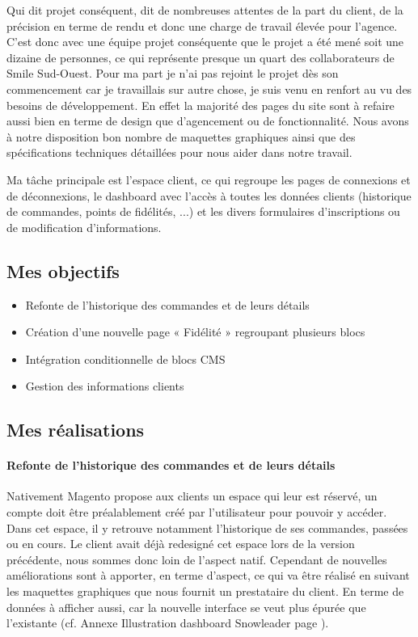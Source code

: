 \documentclass[a4paper,11pt,twoside]{report}
\begin{document}
    Qui dit projet conséquent, dit de nombreuses attentes de la part du client, de la précision en terme de rendu et donc une charge de travail élevée pour l'agence. C'est donc avec une équipe projet conséquente que le projet a été mené soit une dizaine de personnes, ce qui représente presque un quart des collaborateurs de Smile Sud-Ouest. Pour ma part je n'ai pas rejoint le projet dès son commencement car je travaillais sur autre chose, je suis venu en renfort au vu des besoins de développement. En effet la majorité des pages du site sont à refaire aussi bien en terme de design que d'agencement ou de fonctionnalité. Nous avons à notre disposition bon nombre de maquettes graphiques ainsi que des spécifications techniques détaillées pour nous aider dans notre travail. 
    
    Ma tâche principale est l'espace client, ce qui regroupe les pages de connexions et de déconnexions, le dashboard avec l'accès à toutes les données clients (historique de commandes, points de fidélités, ...) et les divers formulaires d'inscriptions ou de modification d'informations. 
    \subsection*{Mes objectifs}
      \begin{itemize}

	\item Refonte de l'historique des commandes et de leurs détails 
	\item Création d'une nouvelle page « Fidélité » regroupant plusieurs blocs
	\item Intégration conditionnelle de blocs CMS
	\item Gestion des informations clients

      \end{itemize}
    \subsection*{Mes réalisations}
    	\paragraph*{Refonte de l'historique des commandes et de leurs détails}
    	Nativement Magento propose aux clients un espace qui leur est réservé, un compte doit être préalablement créé par l'utilisateur pour pouvoir y accéder. Dans cet espace, il y retrouve notamment l'historique de ses commandes, passées ou en cours. Le client avait déjà redesigné cet espace lors de la version précédente, nous sommes donc loin de l'aspect natif. Cependant de nouvelles améliorations sont à apporter, en terme d'aspect, ce qui va être réalisé en suivant les maquettes graphiques que nous fournit un prestataire du client. En terme de données à afficher aussi, car la nouvelle interface se veut plus épurée que l'existante (cf. Annexe Illustration dashboard Snowleader page \pageref{SL_dashboard_customer}). 
    
\end{document}
